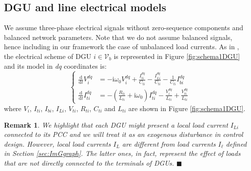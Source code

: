 \documentclass[a4paper]{article}
\theoremstyle{plain}
\newtheorem{rmk}{Remark}
\begin{document}
\subsection{DGU and line electrical models}
     We assume three-phase electrical signals without zero-sequence components and balanced network parameters. 
Note that we do not assume balanced signals, hence including in our framework the case of unbalanced load currents. As in \cite{babazadeh2013robust}, the electrical scheme of DGU $i \in \mathcal V_b$ is represented in Figure \ref{fig:schema1DGU} and its model in \emph{dq} coordinates is:
\begin{equation}
    	\label{eq:DGUeqx}
    	\quad\left\lbrace
    	\begin{aligned}
    	\frac{\mathrm d}{\mathrm dt} V_i^{dq}&=-\mathrm i \omega_0 V_i^{dq}+ \frac{I_{ti}^{dq}}{C_{ti}}-\frac{I_{Li}^{dq}}{C_{ti}}-\frac{1}{C_{ti}}I_{bi}^{dq}\\
    	\frac{\mathrm d}{\mathrm dt}I_{ti}^{dq} &=-\left( \frac{R_{ti}}{L_{ti}}+\mathrm i \omega_0 \right) I_{ti}^{dq} - \frac{V_i^{dq}}{L_{ti}} + \frac{V_{ti}^{dq}}{L_{ti}} 
    	\end{aligned}
    	\right.
    \end{equation}
    where $V_{i}$, $I_{ti}$, $I_{bi}$, $I_{Li}$, $V_{ti}$, $R_{ti}$, $C_{ti}$ and $L_{ti}$ are shown in Figure \ref{fig:schema1DGU}. 
    \begin{rmk}
    	We highlight that each DGU might present a local load current $I_{Li}$ connected to its PCC and we will treat it as an exogenous disturbance in control design. However, local load currents $I_L$ are different from load currents $I_{\ell}$ defined in Section \ref{sec:ImGgraph}. The latter ones, in fact, represent the effect of loads that are not directly connected to the terminals of DGUs. \hspace{70mm} $\blacksquare$
    \end{rmk} 
\end{document}
